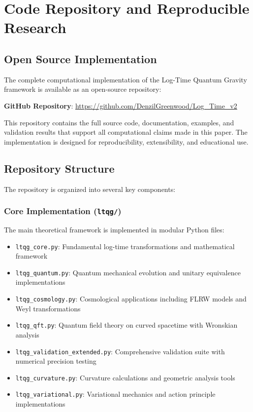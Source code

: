 \section{Code Repository and Reproducible Research}
\label{sec:code_repository}

\subsection{Open Source Implementation}
\label{subsec:open_source}

The complete computational implementation of the Log-Time Quantum Gravity framework is available as an open-source repository:

\begin{center}
\textbf{GitHub Repository}: \url{https://github.com/DenzilGreenwood/Log_Time_v2}
\end{center}

This repository contains the full source code, documentation, examples, and validation results that support all computational claims made in this paper. The implementation is designed for reproducibility, extensibility, and educational use.

\subsection{Repository Structure}
\label{subsec:repository_structure}

The repository is organized into several key components:

\subsubsection{Core Implementation (\texttt{ltqg/})}

The main theoretical framework is implemented in modular Python files:

\begin{itemize}
\item \texttt{ltqg\_core.py}: Fundamental log-time transformations and mathematical framework
\item \texttt{ltqg\_quantum.py}: Quantum mechanical evolution and unitary equivalence implementations  
\item \texttt{ltqg\_cosmology.py}: Cosmological applications including FLRW models and Weyl transformations
\item \texttt{ltqg\_qft.py}: Quantum field theory on curved spacetime with Wronskian analysis
\item \texttt{ltqg\_validation\_extended.py}: Comprehensive validation suite with numerical precision testing
\item \texttt{ltqg\_curvature.py}: Curvature calculations and geometric analysis tools
\item \texttt{ltqg\_variational.py}: Variational mechanics and action principle implementations
\end{itemize}

